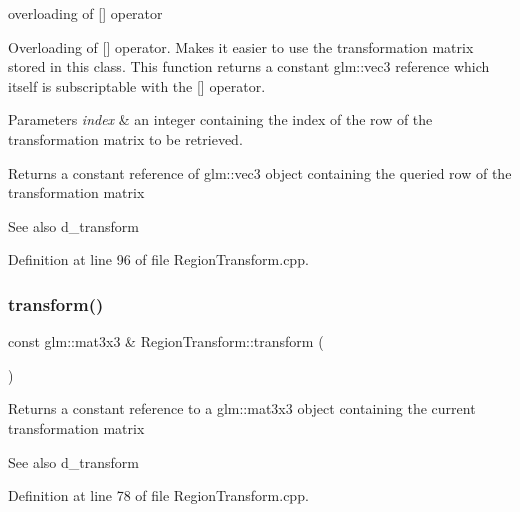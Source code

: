 overloading of \mbox{[}\mbox{]} operator 

Overloading of \mbox{[}\mbox{]} operator. Makes it easier to use the transformation matrix stored in this class. This function returns a constant glm\+::vec3 reference which itself is subscriptable with the \mbox{[}\mbox{]} operator.


\begin{DoxyParams}{Parameters}
{\em index} & an integer containing the index of the row of the transformation matrix to be retrieved.\\
\hline
\end{DoxyParams}
\begin{DoxyReturn}{Returns}
a constant reference of glm\+::vec3 object containing the queried row of the transformation matrix
\end{DoxyReturn}
\begin{DoxySeeAlso}{See also}
d\+\_\+transform 
\end{DoxySeeAlso}


Definition at line 96 of file Region\+Transform.\+cpp.

\mbox{\label{class_region_transform_aa55bac64aa3c3d7210c586be0e481b95}} 
\subsubsection{\texorpdfstring{transform()}{transform()}}
{\footnotesize\ttfamily const glm\+::mat3x3 \& Region\+Transform\+::transform (\begin{DoxyParamCaption}{ }\end{DoxyParamCaption})}

\begin{DoxyReturn}{Returns}
a constant reference to a glm\+::mat3x3 object containing the current transformation matrix
\end{DoxyReturn}
\begin{DoxySeeAlso}{See also}
d\+\_\+transform 
\end{DoxySeeAlso}


Definition at line 78 of file Region\+Transform.\+cpp.

\mbox{\label{class_region_transform_a8d6734d6536be0811d41bf2287d401d9}} 
